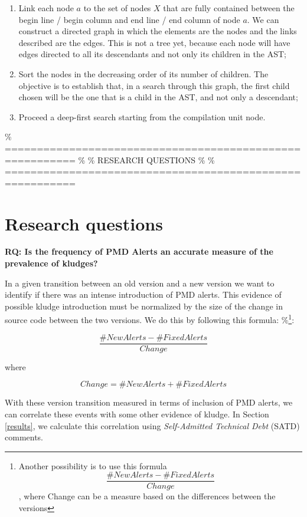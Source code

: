 \documentclass[
]{article}
\begin{document}
\begin{enumerate}
\item
  Link each node \(a\) to the set of nodes \(X\) that are fully
  contained between the begin line / begin column and end line / end
  column of node \(a\). We can construct a directed graph in which
  the elements are the nodes and the links described are the edges. This
  is not a tree yet, because each node will have edges directed to all
  its descendants and not only its children in the AST;

\item
  Sort the nodes in the decreasing order of its number of children. The
  objective is to establish that, in a search through this graph, the
  first child chosen will be the one that is a child in the AST, and not
  only a descendant;

\item
  Proceed a deep-first search starting from the compilation unit node.
\end{enumerate}

\% ========================================================= \% \%
RESEARCH QUESTIONS \% \%
=========================================================

\section{Research questions}
\label{as_whole}

\noindent
\textbf{RQ: Is the frequency of PMD Alerts an accurate measure of the prevalence of kludges?}
\label{PMD_Kludge}

In a given transition between an old version and a new version we want
to identify if there was an intense introduction of PMD alerts. This
evidence of possible kludge introduction must be normalized by the size
of the change in source code between the two versions. We do this by
following this formula:
\%\footnote{Another possibility is to use this formula \[ \frac{\#NewAlerts - \#FixedAlerts}{Change}    \], where Change can be a measure based on the differences between the versions}:

\[ \frac{\#NewAlerts - \#FixedAlerts}{Change}    \]

where

\[Change = \#NewAlerts + \#FixedAlerts\]

With these version transition measured in terms of inclusion of PMD
alerts, we can correlate these events with some other evidence of
kludge. In Section \ref{results}, we calculate this correlation using
\textit{Self-Admitted Technical Debt} (SATD) comments.
\end{document}
